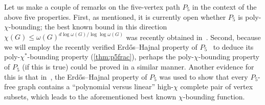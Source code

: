 \documentclass[11pt,reqno]{amsart}
\newcommand{\dd}{\textquotedblleft}
\newcommand{\ee}{\textquotedblright}
\newcommand{\erh}{Erd\H{o}s--Hajnal}
\newcommand{\chis}{\chi^*}
\begin{document}
	Let us make a couple of remarks on the five-vertex path $P_5$ in the context of the above five properties.
	First, as mentioned, it is currently open whether $P_5$ is poly-$\chi$-bounding; the best known bound in this direction
	$\chi(G)\le\omega(G)^{d\log\omega(G)/\log\log\omega(G)}$ was recently obtained in~\cite{2024p5}.
	Second, because we will employ the recently verified \erh{} property of $P_5$~\cite{density7} to deduce its poly-$\chis$-bounding property (\cref{thm:p5frac}),
	perhaps the poly-$\chi$-bounding property of $P_5$ (if this is true) could be proved in a similar manner.
	Another evidence for this is that in~\cite{2024p5}, the \erh{} property of $P_5$ was used to show that every $P_5$-free graph contains a \dd polynomial versus linear\ee{} high-$\chi$ complete pair of vertex subsets, which leads to the aforementioned best known $\chi$-bounding function. 
	
	
\end{document}
